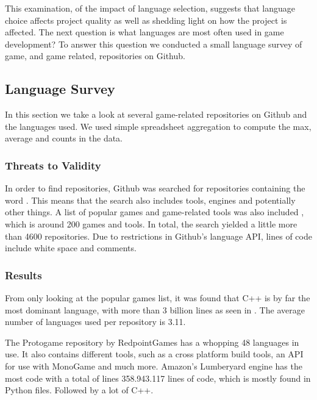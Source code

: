 This examination, of the impact of language selection, suggests that language choice affects project quality as well as shedding light on how the project is affected. The next question is what languages are most often used in game development? To answer this question we conducted a small language survey of game, and game related, repositories on Github.

\subsection{Language Survey}
In this section we take a look at several game-related repositories on Github and the languages used. We used simple spreadsheet aggregation to compute the max, average and counts in the data.

\subsubsection{Threats to Validity}
In order to find repositories, Github was searched for repositories containing the word . This means that the search also includes tools, engines and potentially other things.
A list of popular games and game-related tools was also included \cite{gitgames}, which is around 200 games and tools.
In total, the search yielded a little more than 4600 repositories.
Due to restrictions in Github's language \ac{API}, lines of code include white space and comments.

\subsubsection{Results}
From only looking at the popular games list, it was found that C++ is by far the most dominant language, with more than 3 billion lines as seen in . The average number of languages used per repository is 3.11.

The Protogame repository by RedpointGames has a whopping 48 languages in use. It also contains different tools, such as a cross platform build tools, an \ac{API} for use with MonoGame and much more. Amazon's Lumberyard engine has the most code with a total of lines 358.943.117 lines of code, which is mostly found in Python files. Followed by a lot of C++.


